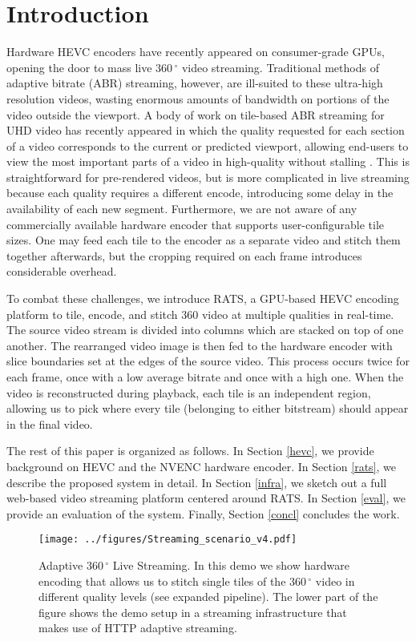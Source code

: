 
\section{Introduction} \label{intro}

Hardware HEVC encoders have recently appeared on consumer-grade GPUs, opening the door to mass live $360\,^{\circ}$ video streaming.
Traditional methods of adaptive bitrate (ABR) streaming, however, are ill-suited to these ultra-high resolution videos, wasting enormous amounts of bandwidth on portions of the video outside the viewport.
A body of work on tile-based ABR streaming for UHD video has recently appeared in which the quality requested for each section of a video corresponds to the current or predicted viewport, allowing end-users to view the most important parts of a video in high-quality without stalling \cite{lefeuvre2016,corbillon2016,PetrangeliSHT17}. This is straightforward for pre-rendered videos, but is more complicated in live streaming because each quality requires a different encode, introducing some delay in the availability of each new segment. Furthermore, we are not aware of any commercially available hardware encoder that supports user-configurable tile sizes. One may feed each tile to the encoder as a separate video and stitch them together afterwards, but the cropping required on each frame introduces considerable overhead.

To combat these challenges, we introduce RATS, a GPU-based HEVC encoding platform to tile, encode, and stitch 360 video at multiple qualities in real-time. The source video stream is divided into columns which are stacked on top of one another. The rearranged video image is then fed to the hardware encoder with slice boundaries set at the edges of the source video. This process occurs twice for each frame, once with a low average bitrate and once with a high one. When the video is reconstructed during playback, each tile is an independent region, allowing us to pick where every tile (belonging to either bitstream) should appear in the final video.

The rest of this paper is organized as follows. In Section \ref{hevc}, we provide background on HEVC and the NVENC hardware encoder. In Section \ref{rats}, we describe the proposed system in detail. In Section \ref{infra}, we sketch out a full web-based video streaming platform centered around RATS. In Section \ref{eval}, we provide an evaluation of the system. Finally, Section \ref{concl} concludes the work.

\renewcommand{\figurename}{Fig.}
\begin{figure*}[t]
	\centering
	\texttt{[image: ../figures/Streaming\_scenario\_v4.pdf]}
	\caption{Adaptive $360\,^{\circ}$ Live Streaming. In this demo we show hardware encoding that allows us to stitch single tiles of the $360\,^{\circ}$ video in different quality levels (see expanded pipeline). The lower part of the figure shows the demo setup in a streaming infrastructure that makes use of HTTP adaptive streaming.}
	\label{fig:pipeline}
\end{figure*}

